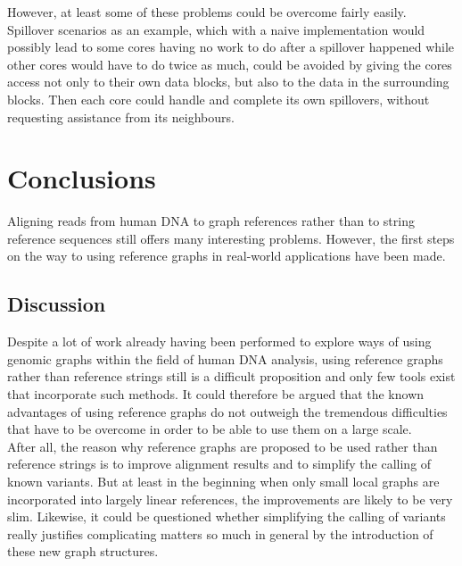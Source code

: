 \documentclass[a4paper,12pt,twoside,BCOR=10mm]{scrbook}
\begin{document}
However, at least some of these problems could be overcome fairly easily. 
Spillover scenarios as an example, which with a naive 
implementation would possibly lead to some cores having no work to do 
after a spillover happened while other cores would have to do twice as much, 
could be avoided by giving the cores access not only to their own data blocks, 
but also to the data in the surrounding blocks. Then each core could handle 
and complete its own spillovers, without requesting assistance from its neighbours.

\chapter{Conclusions}
%

Aligning reads from human DNA to graph references rather than to string reference sequences 
still offers many interesting problems. 
However, the first steps on the way to using reference graphs in real-world applications have been made.

\section{Discussion}

Despite a lot of work already having been performed to explore 
ways of using genomic graphs within the field of human DNA analysis, 
using reference graphs rather than reference strings still 
is a difficult proposition and only few tools exist that incorporate 
such methods. 
It could therefore be argued that the known advantages of using reference 
graphs do not outweigh the tremendous difficulties that have to 
be overcome in order to be able to use them on a large scale. \\
After all, the reason why reference graphs are proposed to be used 
rather than reference strings is to improve alignment results 
and to simplify the calling of known variants. 
But at least in the beginning when only small local graphs are incorporated 
into largely linear references, the improvements are likely to be very slim. 
Likewise, it could be questioned whether simplifying the calling of variants really 
justifies complicating matters so much in general by the introduction of 
these new graph structures.
\end{document}
